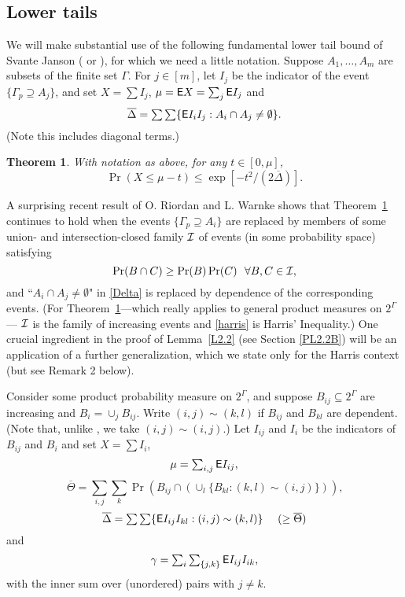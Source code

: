 \documentclass[letterpaper,11pt]{article}
\newtheorem{thm}{Theorem}[section]
\newcommand{\beq}[1]{\begin{equation}\label{#1}}
\newcommand{\enq}[0]{\end{equation}}
\newcommand{\mn}[0]{\medskip\noindent}
\newcommand{\sub}[0]{\subseteq}
\renewcommand{\dots}[0]{,\ldots,}
\newcommand{\ov}[0]{\overline}
\newcommand{\I}[0]{{\cal I}}
\newcommand{\xxx}[0]{B}
\newcommand{\0}[0]{\emptyset}
\newcommand{\gc}[0]{\gamma }
\newcommand{\gD}[0]{\Delta }
\newcommand{\gG}[0]{\Gamma }
\begin{document}
\subsection{Lower tails}\label{SJRW}


\mn
We will make substantial use of
the following fundamental lower tail bound of
Svante Janson (\cite{Janson} or
\cite[Theorem 2.14]{JLR}), for which
we need a little notation.
Suppose $A_1\dots A_m$ are subsets of the
finite set $\gG$.
For $j\in [m]$, let $I_j$ be the indicator of the event
$\{\gG_p\supseteq A_j\}$, and set $X=\sum I_j$,
$\mu = {\sf E} X =\sum_j{\sf E} I_j$
and
\beq{Delta}
\mbox{$\ov{\gD} = \sum\sum\{\E I_iI_j: A_i\cap A_j\neq\0\}.$}
\enq
(Note this includes
diagonal terms.)

\begin{thm}\label{TJanson}
With notation as above, for any $t\in [0,\mu]$,
\[\Pr(X\leq \mu -t) \leq \exp[-t^2/(2\ov{\gD})].\]
\end{thm}





\medskip
A surprising recent result of O. Riordan and L. Warnke
\cite{RW} shows that Theorem~\ref{TJanson} continues
to hold when
the events $\{\gG_p\supseteq A_i\}$ are replaced by
members of
some union- and
intersection-closed
family $\I$ of events (in some probability space)
satisfying
\beq{harris}
\Pr(B\cap C)\geq \Pr(B)\Pr(C) ~~\forall B,C\in \I,
\enq
and ``$A_i\cap A_j\neq \0$" in \eqref{Delta} is replaced
by dependence of the corresponding events.
(For Theorem~\ref{TJanson}---which
really applies to general product measures on $2^\gG$---
$\I$ is the family of increasing events and
\eqref{harris} is Harris' Inequality.)
%
One crucial ingredient in the proof of Lemma~\ref{L2.2}
(see Section \ref{PL2.2B}) will be an
application of a further generalization,
which we state only for the Harris context (but see Remark 2 below).

Consider some product probability measure on $2^\gG$, and
suppose $\xxx_{ij} \sub 2^\gG$ are increasing and
$\xxx_i=\cup_j\xxx_{ij}$.
Write $(i,j)\sim (k,l)$ if $\xxx_{ij}$ and $\xxx_{kl}$
are dependent.
(Note that, unlike \cite{RW},
we take $(i,j)\sim (i,j)$.)
%
Let $I_{ij}$ and $I_i$ be
the indicators of $\xxx_{ij}$ and $\xxx_i$ and
set $X=\sum I_i$,
\[\mbox{$\mu = \sum_{i,j}{\sf E} I_{ij}$,}\]
\[\mbox{$\ov{\Theta}=
\sum_{i,j}\sum_k\Pr(B_{ij}\cap(\cup_l\{\xxx_{kl}:
(k,l)\sim (i,j)\}))$,}\]
\[\mbox{$\ov{\gD} = \sum\sum\{\E I_{ij}I_{kl}:
(i,j)\sim (k,l)\}~~~$ ($\geq \ov{\Theta}$)} \]
and
\[\mbox{$\gc =\sum_i\sum_{\{j,k\}}\E I_{ij}I_{ik}$,}\]
with the inner sum over (unordered) pairs with $j\neq k$.
\end{document}
